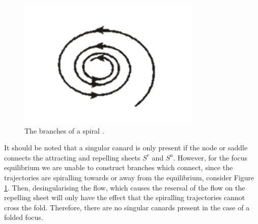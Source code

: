 \begin{figure}[h!]\centering
	\includegraphics{Images/spiral3}
	\caption{The branches of a spiral \citep{Spiral}.}
	\label{fig: spiral}
\end{figure}\newpage

It should be noted that a singular canard is only present if the node or saddle connects the attracting and repelling sheets $ S^r $ and $ S^a $.
However, for the focus equilibrium we are unable to construct branches which connect, since the trajectories are spiralling towards or away from the equilibrium, consider Figure \ref{fig: spiral}. Then, desingularising the flow, which causes the resersal of the flow on the repelling sheet will only have the effect that the spiralling trajectories cannot cross the fold. Therefore, there are no singular canards present in the case of a folded focus.

